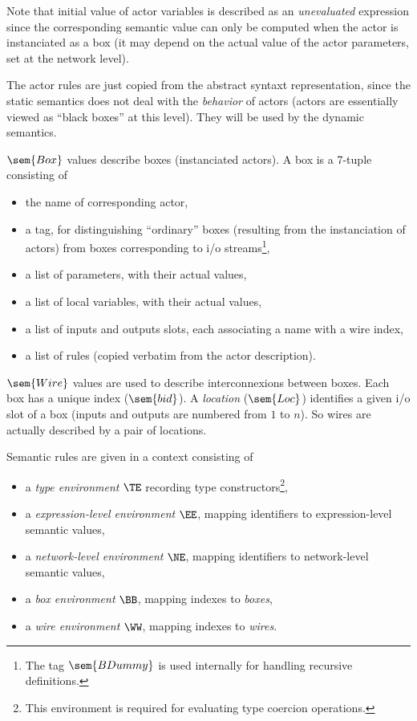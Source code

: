 Note that initial value of actor variables is described as an \emph{unevaluated} expression since
the corresponding semantic value can only be computed when the actor is instanciated as a box (it
may depend on the actual value of the actor parameters, set at the network level).

The actor rules are just copied from the abstract syntaxt representation, since the static semantics
does not deal with the \emph{behavior} of actors (actors are essentially viewed as ``black boxes''
at this level). They will be used by the dynamic semantics.

\medskip
$\sem{Box}$ values describe boxes (instanciated actors). A box is a 7-tuple consisting of 
\begin{itemize}
\item the name of corresponding actor,
\item a tag, for distinguishing ``ordinary'' boxes (resulting from the instanciation of actors) from
  boxes corresponding to i/o streams\footnote{The tag $\sem{BDummy}$ is used internally for handling
    recursive definitions.},
\item a list of parameters, with their actual values,
\item a list of local variables, with their actual values,
\item a list of inputs and outputs slots, each associating a name with a wire index,
\item a list of rules (copied verbatim from the actor description). 
\end{itemize}

\medskip
$\sem{Wire}$ values are used to describe
interconnexions between boxes. Each box has a unique index ($\sem{bid}$). A \emph{location}
($\sem{Loc}$) identifies a given i/o slot of a box (inputs and outputs are numbered from $1$ to
$n$). So wires are actually described by a pair of locations.

\medskip
Semantic rules are given in a context consisting of
\begin{itemize}
\item a \emph{type environment} $\TE$ recording type constructors\footnote{This environment is
    required for evaluating type coercion operations.},
\item a \emph{expression-level environment} $\EE$, mapping identifiers to expression-level semantic values,
\item a \emph{network-level environment} $\NE$, mapping identifiers to network-level semantic values,
\item a \emph{box environment} $\BB$, mapping indexes to \emph{boxes},
\item a \emph{wire environment} $\WW$, mapping indexes to \emph{wires}.
\end{itemize}

